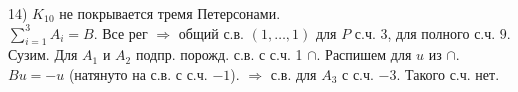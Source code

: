 14) $K_{10}$ не покрывается тремя Петерсонами.\\

$\sum\limits_{i=1}^3 A_i = B$. Все рег $\Rightarrow$ общий с.в. $(1,\dots,1)$ для $P$ с.ч. 3, для полного с.ч. $9$. Сузим. Для $A_1$ и $A_2$ подпр. порожд. с.в. с с.ч. 1 $\cap$. Распишем для $u$ из $\cap$. $Bu = -u$ (натянуто на с.в. с с.ч. $-1$). $\Rightarrow$ с.в. для $A_3$ с с.ч. $-3$. Такого с.ч. нет.
